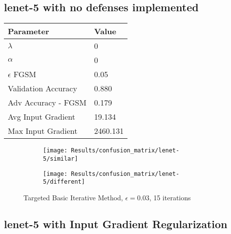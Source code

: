 \documentclass[draft,final]{vutinfth} %
\begin{document}
\subsection{lenet-5 with no defenses implemented}

\begin{table}[h]
  \centering
  \begin{tabular}{ll}
    \toprule
			Parameter			& Value   \\
    \midrule
			$\lambda$								& 0				\\
			$\alpha$								& 0				\\
			$\epsilon$ FGSM					& 0.05		\\
			
			Validation Accuracy			& 0.880		\\ 
			Adv Accuracy - FGSM			& 0.179		\\
			
			Avg Input Gradient			& 19.134	\\
			Max Input Gradient			& 2460.131\\
    \bottomrule
  \end{tabular}
\end{table}


\begin{figure}[h]
  \begin{subfigure}[b]{0.75\columnwidth}
		\centering
    \texttt{[image: Results/confusion\_matrix/lenet-5/similar]}
    \label{fig:exp:cm:lenet-5:similar}
  \end{subfigure}
  \begin{subfigure}[b]{0.75\columnwidth}
		\centering
    \texttt{[image: Results/confusion\_matrix/lenet-5/different]}
    \label{fig:exp:cm:lenet-5:different}
  \end{subfigure}
  \caption{Targeted Basic Iterative Method, $\epsilon = 0.03$, 15 iterations}
  \label{fig:exp:cm:lenet-5}
\end{figure}

\subsection{lenet-5 with Input Gradient Regularization}
\end{document}
